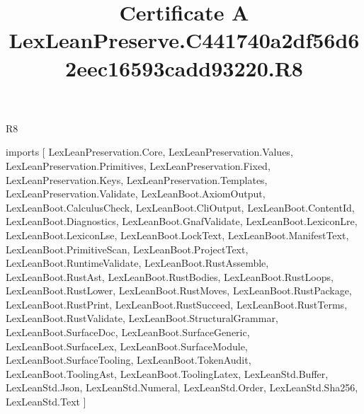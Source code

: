 \begin{lexlean}{R8}
\title{Certificate A LexLeanPreserve.C441740a2df56d62eec16593cadd93220.R8}
\begin{coremodule}
imports [
  LexLeanPreservation.Core,
  LexLeanPreservation.Values,
  LexLeanPreservation.Primitives,
  LexLeanPreservation.Fixed,
  LexLeanPreservation.Keys,
  LexLeanPreservation.Templates,
  LexLeanPreservation.Validate,
  LexLeanBoot.AxiomOutput,
  LexLeanBoot.CalculusCheck,
  LexLeanBoot.CliOutput,
  LexLeanBoot.ContentId,
  LexLeanBoot.Diagnostics,
  LexLeanBoot.GnafValidate,
  LexLeanBoot.LexiconLre,
  LexLeanBoot.LexiconLse,
  LexLeanBoot.LockText,
  LexLeanBoot.ManifestText,
  LexLeanBoot.PrimitiveScan,
  LexLeanBoot.ProjectText,
  LexLeanBoot.RuntimeValidate,
  LexLeanBoot.RustAssemble,
  LexLeanBoot.RustAst,
  LexLeanBoot.RustBodies,
  LexLeanBoot.RustLoops,
  LexLeanBoot.RustLower,
  LexLeanBoot.RustMoves,
  LexLeanBoot.RustPackage,
  LexLeanBoot.RustPrint,
  LexLeanBoot.RustSucceed,
  LexLeanBoot.RustTerms,
  LexLeanBoot.RustValidate,
  LexLeanBoot.StructuralGrammar,
  LexLeanBoot.SurfaceDoc,
  LexLeanBoot.SurfaceGeneric,
  LexLeanBoot.SurfaceLex,
  LexLeanBoot.SurfaceModule,
  LexLeanBoot.SurfaceTooling,
  LexLeanBoot.TokenAudit,
  LexLeanBoot.ToolingAst,
  LexLeanBoot.ToolingLatex,
  LexLeanStd.Buffer,
  LexLeanStd.Json,
  LexLeanStd.Numeral,
  LexLeanStd.Order,
  LexLeanStd.Sha256,
  LexLeanStd.Text
]


\end{coremodule}
\end{lexlean}

